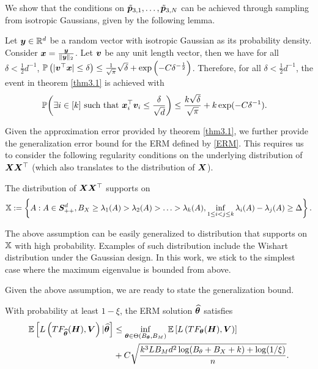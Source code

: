 We show that the conditions on $\tilde{\boldsymbol{p}}_{3,1},\ldots,\tilde{\boldsymbol{p}}_{3,N}$ can be achieved through sampling from isotropic Gaussians, given by the following lemma.
    \begin{lemma}\label{lm3.1.1}\label{lm3.1}
        Let $\boldsymbol{y}\in\mathbb{R}^d$ be a random vector with isotropic Gaussian as its probability density. Consider $\boldsymbol{x}=\frac{\boldsymbol{y}}{\Vert\boldsymbol{y}\Vert_2}$. Let $\boldsymbol{v}$ be any unit length vector, then we have for all $\delta<\frac{1}{2}d^{-1}$,
           $ \mathbb{P}\left(|\boldsymbol{v}^\top\boldsymbol{x}|\leq\delta\right)\leq  \frac{1}{\sqrt{\pi}}\sqrt\delta+\exp\left(-C\delta^{-\frac{1}{2}}\right)$.
        Therefore, for all $\delta<\frac{1}{2}d^{-1}$, the event in theorem \ref{thm3.1} is achieved with
        \begin{align*}
             \mathbb{P}{\bigg (}\exists i\in[k]\text{ such that }&\boldsymbol{x}_i^\top\boldsymbol{v}_i\leq\frac{\delta}{\sqrt d}{\bigg )}\leq \frac{k\sqrt{\delta}}{\sqrt{\pi}}+k\exp(-C\delta^{-1}).
        \end{align*}
    \end{lemma}
Given the approximation error provided by theorem \ref{thm3.1}, we further provide the generalization error bound for the ERM defined by \eqref{ERM}. This requires us to consider the following regularity conditions on the underlying distribution of $\boldsymbol{X}\boldsymbol{X}^\top$ (which also translates to the distribution of $\boldsymbol{X}$).
\begin{assumption}\label{assump1}
    The distribution of $\boldsymbol{X}\boldsymbol{X}^\top$ supports on $$\mathbb{X}:=\left\{A:A\in\boldsymbol{S}^d_{++},  B_X\geq\lambda_1(A)>\lambda_2(A)>\ldots>\lambda_k(A),\inf_{1\leq i<j\leq k}\lambda_i(A)-\lambda_j(A)\geq\Delta\right\}.$$
\end{assumption}
\begin{remark}
    The above assumption can be easily generalized to distribution that supports on $\mathbb{X}$ with high probability. Examples of such distribution include the Wishart distribution under the Gaussian design. In this work, we stick to the simplest case where the maximum eigenvalue is bounded from above.
\end{remark}
Given the above assumption, we are ready to state the generalization bound.
\begin{proposition}\label{genbound}
   With probability at least $1-\xi$, the ERM solution $\widehat{\boldsymbol{\theta}}$ satisfies
    \begin{align*}
        \mathbb{E}\left[L\left(TF_{\widehat{\boldsymbol{\theta}}}(\boldsymbol{H}),\boldsymbol{V}\right)|\widehat{\boldsymbol{\theta}}\right]&\leq\inf_{\boldsymbol{\theta}\in\Theta(B_{\boldsymbol{\theta}},B_M)}\mathbb{E}\left[L\left(TF_{\boldsymbol{\theta}}(\boldsymbol{H}),\boldsymbol{V}\right)\right]\\
        &+ C \sqrt{\frac{k^3LB_Md^2\log(B_{\theta}+B_X+k)+\log(1/\xi)}{n}}.
    \end{align*}
\end{proposition}
